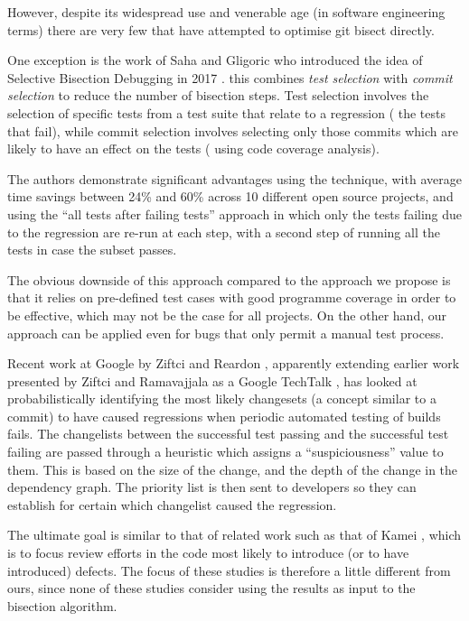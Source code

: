 \documentclass[10pt,journal,compsoc]{IEEEtran}
\begin{document}
However, despite its widespread use and venerable age (in software engineering terms) there are very few that have attempted to optimise {\code git bisect} directly.

One exception is the work of Saha and Gligoric who introduced the idea of Selective Bisection Debugging in 2017 \cite{saha2017}. this combines {\it test selection\/} with {\it commit selection\/} to reduce the number of bisection steps. Test selection involves the selection of specific tests from a test suite that relate to a regression (\ie\/ the tests that fail), while commit selection involves selecting only those commits which are likely to have an effect on the tests (\eg\/ using code coverage analysis).

The authors demonstrate significant advantages using the technique, with average time savings between 24\% and 60\% across 10 different open source projects, and using the ``all tests after failing tests'' approach in which only the tests failing due to the regression are re-run at each step, with a second step of running all the tests in case the subset passes.

The obvious downside of this approach compared to the approach we propose is that it relies on pre-defined test cases with good programme coverage in order to be effective, which may not be the case for all projects. On the other hand, our approach can be applied even for bugs that only permit a manual test process.

Recent work at Google by Ziftci and Reardon \cite{ziftci2017}, apparently extending earlier work presented by Ziftci and Ramavajjala as a Google TechTalk \cite{ziftci2013}, has looked at probabilistically identifying the most likely changesets (a concept similar to a commit) to have caused regressions when periodic automated testing of builds fails. The changelists between the successful test passing and the successful test failing are passed through a heuristic which assigns a ``suspiciousness'' value to them. This is based on the size of the change, and the depth of the change in the dependency graph. The priority list is then sent to developers so they can establish for certain which changelist caused the regression. 

The ultimate goal is similar to that of related work such as that of Kamei \etal, which is to focus review efforts in the code most likely to introduce (or to have introduced) defects. The focus of these studies is therefore a little different from ours, since none of these studies consider using the results as input to the bisection algorithm.
\end{document}
